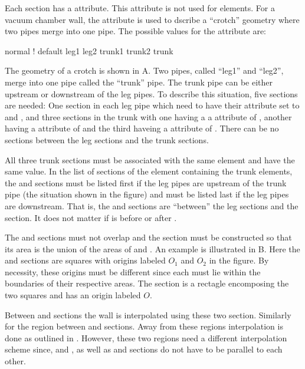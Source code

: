 
Each section has a  attribute. This attribute is not used for 
 elements. For a vacuum chamber wall, the  
attribute is used to dscribe a ``crotch'' geometry where
two pipes merge into one pipe. The possible values for the  
attribute are:
\begin{example}
  normal     ! default
  leg1
  leg2
  trunk1
  trunk2
  trunk
\end{example}
The geometry of a crotch is shown in A. Two pipes,
called ``leg1'' and ``leg2'', merge into one pipe called the ``trunk''
pipe.  The trunk pipe can be either upstream or downstream of the leg
pipes.  To describe this situation, five sections are needed: One
section in each leg pipe which need to have their  attribute
set to  and , and three sections in the trunk with
one having a a  attribute of , another having a
 attribute of  and the third haveing a 
attribute of . There can be no sections between the leg
sections and the trunk sections.

All three trunk sections must be associated with the same element and
have the same  value. In the list of sections of the element
containing the trunk elements, the  and 
sections must be listed first if the leg pipes are upstream of the
trunk pipe (the situation shown in the figure) and must be listed last
if the leg pipes are downstream. That is, the  and
 sections are ``between'' the leg sections and the
 section. It does not matter if  is before or
after .

The  and  sections must not overlap and the
 section must be constructed so that its area is the union
of the areas of  and . An example is illustrated
in B. Here the  and  sections are
squares with origins labeled $O_1$ and $O_2$ in the figure. By
necessity, these origins must be different since each must lie within
the boundaries of their respective areas. The  section is a
rectagle encomposing the two squares and has an origin labeled $O$.

Between  and  sections the wall is interpolated
using these two section. Similarly for the region between 
and  sections. Away from these regions interpolation is
done as outlined in . However, these two
regions need a different interpolation scheme since,  and
, as well as  and  sections do not have
to be parallel to each other.

